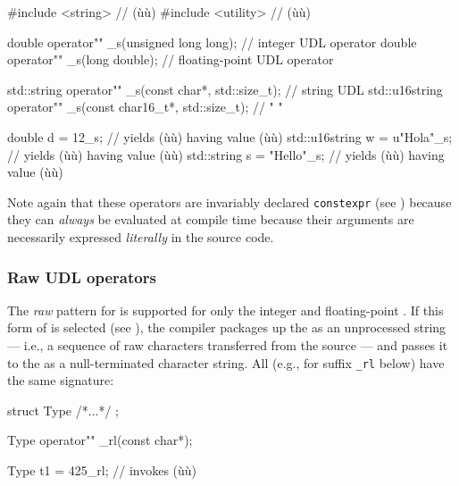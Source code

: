 \begin{emcppslisting}
#include <string>   // (ù{}ù)
#include <utility>  // (ù{}ù)

double operator"" _s(unsigned long long);  // integer UDL operator
double operator"" _s(long double);         // floating-point UDL operator

std::string    operator"" _s(const char*,     std::size_t);  // string UDL
std::u16string operator"" _s(const char16_t*, std::size_t);  //   "     "

double         d = 12_s;       // yields (ù{}ù) having value (ù{}ù)
std::u16string w = u"Hola"_s;  // yields (ù{}ù) having value (ù{}ù)
std::string    s = "Hello"_s;  // yields (ù{}ù) having value (ù{}ù)
\end{emcppslisting}
    
\noindent Note again that these operators are invariably declared
\lstinline!constexpr! (see )
because they can \emph{always} be evaluated at compile time because
their arguments are necessarily expressed \emph{literally} in the source
code.

\subsubsection[Raw UDL operators]{Raw UDL operators}\label{raw-udl-operators}

The \emph{raw} pattern for  is supported for only
the integer and floating-point . If this
form of  is selected (see ), the compiler packages up the  as an
unprocessed string --- i.e., a sequence of raw characters transferred
from the source --- and passes it to the  as a
null-terminated character string. All  (e.g.,
for suffix \lstinline!_rl! below) have the same signature:

\begin{emcppslisting}
struct Type { /*...*/ };

Type operator"" _rl(const char*);

Type t1 = 425_rl;  // invokes (ù{}ù)
\end{emcppslisting}
    
